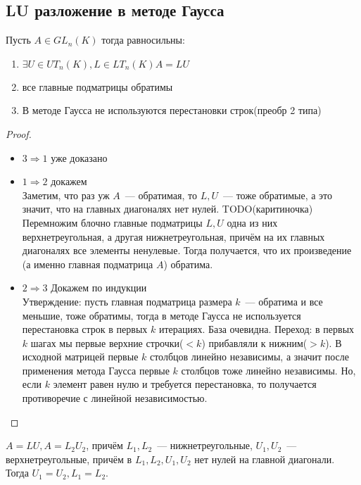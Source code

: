 \subsection{LU разложение в методе Гаусса}
\begin{theorem}
    Пусть $A\in GL_n(K)$ тогда равносильны:
    \begin{enumerate}
        \item $\exists U\in UT_n(K), L\in LT_n(K) A = LU$
        \item все главные подматрицы обратимы
        \item В методе Гаусса не используются перестановки строк(преобр 2 типа)
    \end{enumerate}
\end{theorem}
\begin{proof}\leavevmode
    \begin{itemize}
        \item $3\Rightarrow 1$ уже доказано
        \item  $1\Rightarrow 2$ докажем\\
            Заметим, что раз уж $A$~--- обратимая, то $L, U$~--- тоже обратимые, а это
            значит, что на главных диагоналях нет нулей.
            TODO(каритиночка)
            Перемножим блочно главные подматрицы $L, U$ одна из них верхнетреугольная, а
            другая нижнетреугольная, причём на их главных диагоналях все элементы ненулевые.
            Тогда получается, что их произведение (а именно главная подматрица $A$) обратима.
        \item $2\Rightarrow 3$ Докажем по индукции\\
            Утверждение: пусть главная подматрица размера $k$~--- обратима и все меньшие, тоже
            обратимы, тогда в методе Гаусса не используется перестановка строк в первых $k$ итерациях.
            База очевидна. Переход: в первых $k$ шагах мы первые верхние строчки($<k$) прибавляли к
            нижним($>k$). В исходной матрицей первые $k$ столбцов линейно независимы, а значит после
            применения метода Гаусса первые $k$ столбцов тоже линейно независимы. Но, если $k$ элемент
            равен нулю и требуется перестановка, то получается противоречие с линейной независимостью.
    \end{itemize}
\end{proof}
\begin{statement}
    $A = LU, A = L_2U_2$, причём $L_1,L_2$~--- нижнетреугольные, $U_1, U_2$~--- верхнетреугольные,
    причём в $L_1,L_2, U_1,U_2$ нет нулей на главной диагонали. Тогда $U_1=U_2, L_1 =L_2$.
\end{statement}
